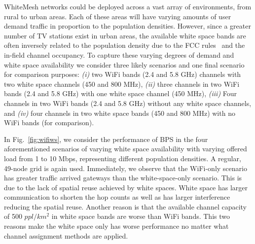 WhiteMesh networks could be deployed across a vast array of environments, from
rural to urban areas.  Each of these areas will have varying amounts of user
demand traffic in proportion to the population densities.  However, since a greater
number of TV stations exist in urban areas, the available white space bands are
often inversely related to the population density due to the FCC rules~\cite{fccwhitespace} 
and the in-field channel occupancy. To capture these varying
degrees of demand and white space availability we consider three likely scenarios
and one final scenario for comparison purposes: {\it (i)} two WiFi bands (2.4 and
5.8 GHz) channels with two white space channels (450 and 800 MHz), {\it (ii)} three channels in two WiFi
bands (2.4 and 5.8 GHz) with one white space channel (450 MHz), {\it (iii)} Four channels in two
WiFi bands (2.4 and 5.8 GHz) without any white space channels, and {\it (iv)}
four channels in two white space bands (450 and 800 MHz) with no WiFi bands (for comparison).



In Fig.~\ref{fig:wifiws}, we consider the performance of BPS in the four aforementioned
scenarios of varying white space availability with varying offered load from 1 to 10 Mbps,
representing different population densities. A regular, 49-node grid is again used.
Immediately, we observe that the WiFi-only scenario has greater traffic arrived gateways
than the white-space-only scenario.  This is due to the lack of spatial reuse achieved
by white spaces. White space has larger communication to shorten the hop counts as well as 
has larger interference reducing the spatial reuse. Another reason is that the available 
channel capacity of 500 $ppl/km^2$ in white space bands are worse than WiFi bands. 
This two reasons make the white space only has worse performance no matter what channel
assignment methods are applied.

